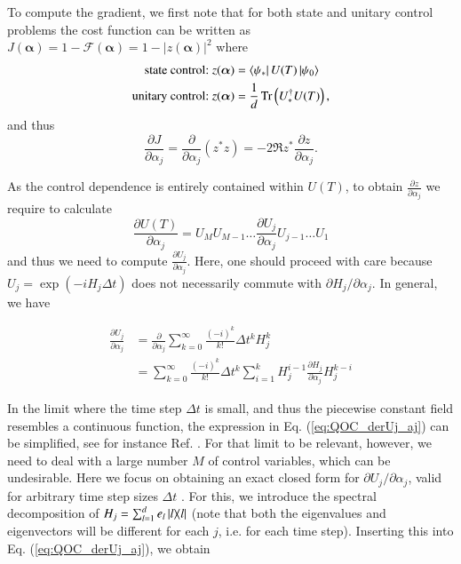 To compute the gradient, we first note that for both state and unitary control problems the cost function can be written as $J(\bm{\alpha})=1-\mathcal{F}(\bm{\alpha})=1-|z(\bm{\alpha})|^2$ where
\begin{align}
\text{state control:} & \ z(\bm{\alpha})=\bra{\psi_\ast}U(T)\ket{\psi_0} \\
\text{unitary control:} & \ z(\bm{\alpha})=\frac{1}{d}\Tr\left(U_\ast^\dagger U(T)\right), 
\end{align}
and thus
\begin{equation}
    \frac{\partial J}{\partial \alpha_j} = \frac{\partial}{\partial \alpha_j}(z^\ast z) =  -2\Re{z^\ast \frac{\partial z}{\partial \alpha_j}}.
    \label{eq:QOC_gradZ}
\end{equation}

As the control dependence is entirely contained within $U(T)$, to obtain $\frac{\partial z}{\partial \alpha_j}$ we require to calculate
\begin{equation}
      \frac{\partial U(T)}{\partial \alpha_j} =U_M U_{M-1}\ldots \frac{\partial U_j}{\partial \alpha_j} U_{j-1}\ldots U_1
    \label{eq:QOC_gradient0}
\end{equation}
and thus we need to compute $\frac{\partial U_j}{\partial \alpha_j}$. Here, one should proceed with care because $U_j=\exp(-i H_j \Delta t)$ does not necessarily commute with $\partial H_j/\partial \alpha_j$. In general, we have

\begin{align}
    \frac{\partial U_j}{\partial \alpha_j} & = \frac{\partial}{\partial \alpha_j}\sum\limits_{k=0}^\infty \frac{(-i)^k}{k!}\Delta t^k H_j^k \\
    & = \sum\limits_{k=0}^\infty \frac{(-i)^k}{k!}\Delta t^k \sum\limits_{i=1}^k H_j^{i-1} \frac{\partial H_j}{\partial \alpha_j} H_j^{k-i}
    \label{eq:QOC_derUj_aj}
\end{align}

In the limit where the time step $\Delta t$ is small, and thus the piecewise constant field resembles a continuous function, the expression in Eq. (\ref{eq:QOC_derUj_aj}) can be simplified, see for instance Ref. \cite{khaneja2005,ansel2024_arxiv}. For that limit to be relevant, however, we need to deal with a large number $M$ of control variables, which can be undesirable. Here we focus on obtaining an exact closed form for $\partial U_j/\partial \alpha_j$, valid for arbitrary time step sizes $\Delta t$ \cite{machnes2011,motzoi2011}. For this, we introduce the spectral decomposition of $H_j = \sum_{l=1}^d e_l \ketbra{l}{l}$ (note that both the eigenvalues and eigenvectors will be different for each $j$, i.e. for each time step). Inserting this into Eq. (\ref{eq:QOC_derUj_aj}), we obtain


